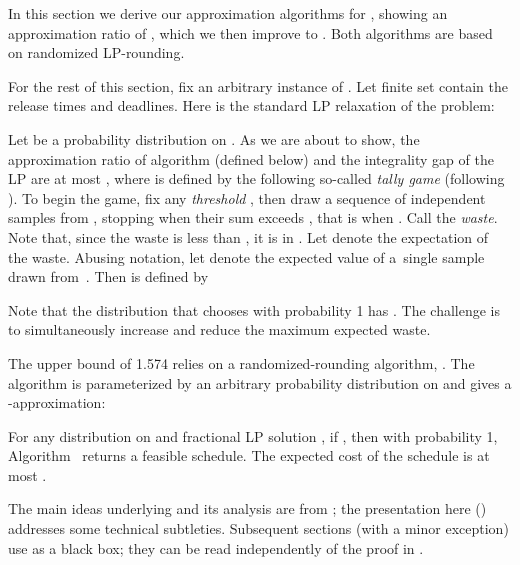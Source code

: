 





In this section we derive our approximation algorithms for , showing an
approximation ratio of , which we then improve to .
Both algorithms are based on randomized LP-rounding.



For the rest of this section, fix an arbitrary instance
 of {\JRPD}.
Let finite set  contain the release times and deadlines.
Here is the standard LP relaxation of the problem:



Let  be a probability distribution on . As we are about to show,
the approximation ratio of algorithm  (defined below)
and the integrality gap of the LP
are at most , where  
is defined by the following so-called {\em tally game} (following \cite{jrp-deadlines-nonner}).
To begin the game, fix any {\em threshold} ,
then draw a sequence of independent samples  
from , stopping when their sum exceeds ,
that is when .
Call  the {\em waste}.
Note that, since the waste is less than , it is in .
Let  denote the expectation of the waste.
Abusing notation, let  denote the expected value of a~single sample drawn from~.
Then  is defined by



Note that the distribution  that chooses  with probability 1 has 
.
The challenge is to simultaneously increase  and reduce the maximum expected waste.



The upper bound of 1.574 relies on a randomized-rounding algorithm, .
The algorithm is parameterized by an arbitrary probability distribution  on 
and gives a -approximation:

\begin{lemma}\label{lemma: round}
For any distribution  on  and fractional LP solution ,
if ,
then with probability 1, Algorithm~ 
returns a feasible schedule.
The expected cost of the schedule is at most .
\end{lemma}

The main ideas underlying  and its analysis are from \cite{jrp-deadlines-nonner};
the presentation here () addresses some technical subtleties.
Subsequent sections (with a minor exception) use  as a black box;
they can be read independently of the proof in .



